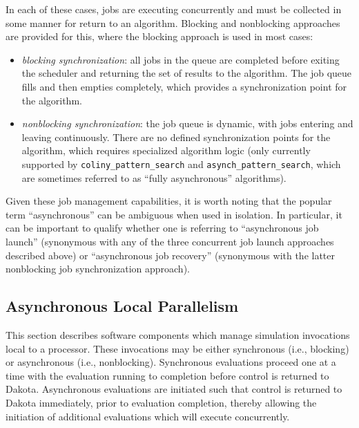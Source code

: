 In each of these cases, jobs are executing concurrently and must be
collected in some manner for return to an algorithm.  Blocking and
nonblocking approaches are provided for this, where the blocking
approach is used in most cases:
\begin{itemize}
\item \emph{blocking synchronization}: all jobs in the queue are
completed before exiting the scheduler and returning the set of
results to the algorithm.  The job queue fills and then empties
completely, which provides a synchronization point for the algorithm.

\item \emph{nonblocking synchronization}: the job queue is dynamic,
with jobs entering and leaving continuously.  There are no defined
synchronization points for the algorithm, which requires specialized
algorithm logic (only currently supported by
\texttt{coliny\_pattern\_search} and \texttt{asynch\_pattern\_search}, which
are sometimes referred to as ``fully asynchronous'' algorithms).
\end{itemize}

Given these job management capabilities, it is worth noting that the
popular term ``asynchronous'' can be ambiguous when used in isolation.
In particular, it can be important to qualify whether one is referring
to ``asynchronous job launch'' (synonymous with any of the three
concurrent job launch approaches described above) or ``asynchronous
job recovery'' (synonymous with the latter nonblocking job
synchronization approach).


\subsection{Asynchronous Local Parallelism}\label{parallel:SLP:local}

This section describes software components which manage simulation
invocations local to a processor. These invocations may be either
synchronous (i.e., blocking) or asynchronous (i.e., nonblocking).
Synchronous evaluations proceed one at a time with the evaluation
running to completion before control is returned to Dakota.
Asynchronous evaluations are initiated such that control is returned
to Dakota immediately, prior to evaluation completion, thereby
allowing the initiation of additional evaluations which will execute
concurrently.

